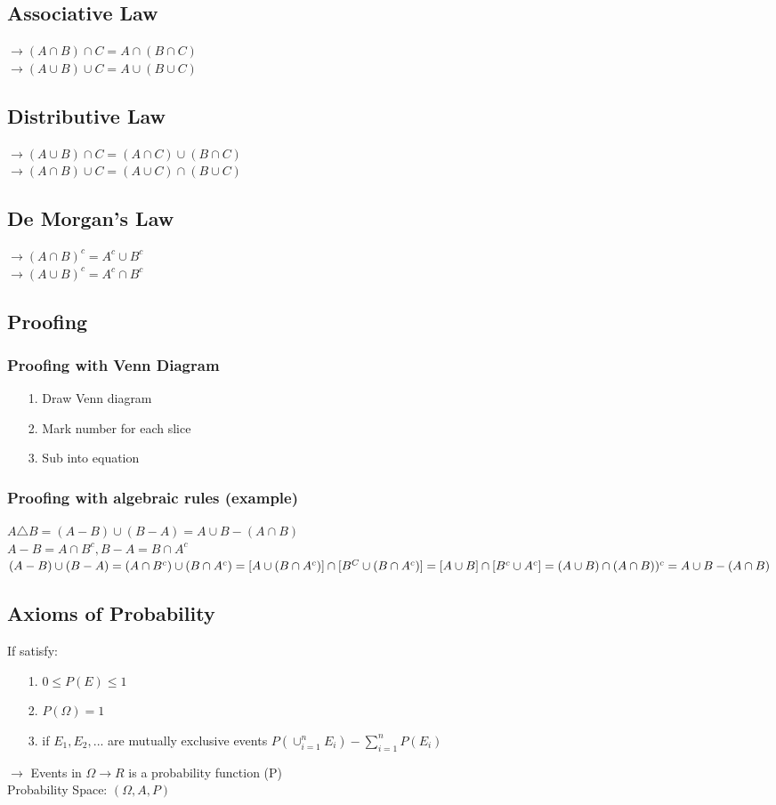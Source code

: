 \documentclass{article}
\begin{document}
\subsection{Associative Law}
$\rightarrow (A \cap B) \cap C = A \cap (B \cap C)$ \\
$\rightarrow (A \cup B) \cup C = A \cup (B \cup C)$
\subsection{Distributive Law}
$\rightarrow (A \cup B) \cap C = (A \cap C) \cup (B \cap C)$ \\
$\rightarrow (A \cap B ) \cup C = (A \cup C) \cap (B \cup C)$
\subsection{De Morgan's Law}
$\rightarrow (A \cap B)^c = A^c \cup B^c$ \\
$\rightarrow (A \cup B)^c = A^c \cap B^c$
\subsection{Proofing}
\subsubsection{Proofing with Venn Diagram}
\begin{itemize}
    \item[1.] Draw Venn diagram
    \item[2.] Mark number for each slice
    \item[3.] Sub into equation
\end{itemize}
\subsubsection{Proofing with algebraic rules (example)}
$A \triangle B = (A-B) \cup (B-A) = A \cup B - (A \cap B)$\\
$A-B = A \cap B^c , B-A = B \cap A^c$ \\
$(A-B) \cup (B-A) = (A \cap B^c) \cup (B \cap A^c) = [A \cup (B \cap A^c)] \cap [B^C \cup (B \cap A^c)] \\ = [A \cup B] \cap [B^c \cup A^c] = (A \cup B) \cap (A \cap B))^c = A \cup B - (A \cap B)$

\subsection{Axioms of Probability}
If satisfy: \\
\begin{itemize}
\item[1.] $ 0 \leq P(E) \leq 1$ \\
\item[2.] $P(\Omega) =1$ \\
\item[3.] if $E_1,E_2,...$ are mutually exclusive events $P(\cup_{i=1}^n E_i) - \sum_{i=1}^n P(E_i)$ \\
\end{itemize}
$\rightarrow$ Events in $\Omega \rightarrow R$ is a probability function (P) \\
Probability Space: $(\Omega, A, P)$ \\
\end{document}
